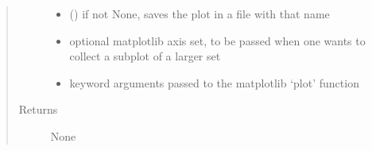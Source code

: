 \documentclass[letterpaper,10pt,english]{sphinxmanual}
\begin{document}
\begin{fulllineitems}
\begin{quote}
\begin{description}
\begin{itemize}
\item {} 
\sphinxAtStartPar
{} () \textendash{} if not None, saves the plot in a file with that name

\item {} 
\sphinxAtStartPar
{} \textendash{} optional matplotlib axis set, to be passed when one wants to collect a subplot of a larger set

\item {} 
\sphinxAtStartPar
{} \textendash{} keyword arguments passed to the matplotlib ‘plot’ function

\end{itemize}

\item[{Returns}] \leavevmode
\sphinxAtStartPar
None

\end{description}\end{quote}

\end{fulllineitems}

\end{document}
